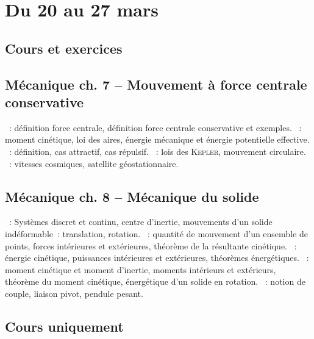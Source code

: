 \documentclass[a4paper, 12pt, final, garamond]{book}
\begin{document}
\setcounter{chapter}{21}

\chapter{Du 20 au 27 mars}

\section{Cours et exercices}
\section*{Mécanique ch. 7 -- Mouvement à force centrale conservative}
\begin{enumerate}[label=\Roman*]
    ~: définition force centrale,
        définition force centrale conservative et exemples.
    ~: moment cinétique, loi des aires, énergie
        mécanique et énergie potentielle effective.
    ~: définition, cas attractif, cas répulsif.
    ~: lois des \textsc{Kepler}, mouvement circulaire.
    ~: vitesses cosmiques, satellite
        géostationnaire.
\end{enumerate}

\section*{Mécanique ch. 8 -- Mécanique du solide}
\begin{enumerate}[label=\Roman*]
    ~: Systèmes discret et continu, centre
    d'inertie, mouvements d'un solide indéformable~: translation, rotation.
    ~: quantité de mouvement d'un ensemble de points, forces
    intérieures et extérieures, théorème de la résultante cinétique.
    ~: énergie cinétique, puissances
    intérieures et extérieures, théorèmes énergétiques.
    ~: moment cinétique et moment
    d'inertie, moments intérieurs et extérieurs, théorème du moment cinétique,
    énergétique d'un solide en rotation.
    ~: notion de couple, liaison pivot,
    pendule pesant.
\end{enumerate}

\section{Cours uniquement}
\end{document}
